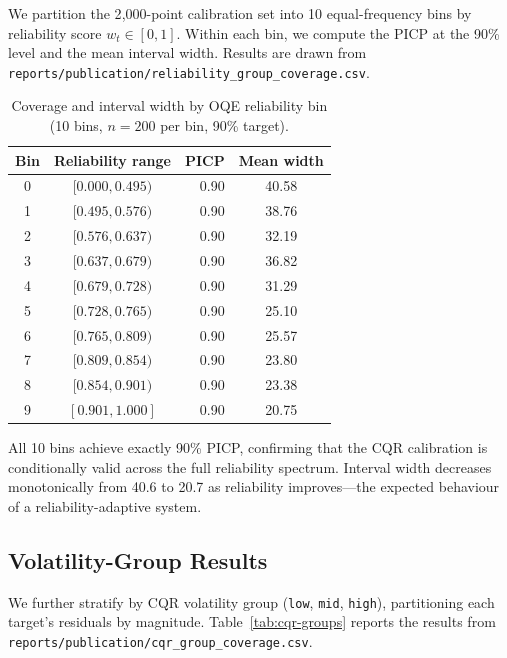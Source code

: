 We partition the 2{,}000-point calibration set into 10 equal-frequency
bins by reliability score $w_t \in [0, 1]$.  Within each bin, we
compute the PICP at the 90\% level and the mean interval width.
Results are drawn from
\texttt{reports/publication/reliability\_group\_coverage.csv}.

\begin{table}[ht]
\centering
\caption{Coverage and interval width by OQE reliability bin
  (10 bins, $n=200$ per bin, 90\% target).}
\label{tab:reliability-coverage}
\begin{tabular}{ccrc}
\toprule
\textbf{Bin} & \textbf{Reliability range} & \textbf{PICP} &
  \textbf{Mean width} \\
\midrule
0 & $[0.000, 0.495)$ & 0.90 & 40.58 \\
1 & $[0.495, 0.576)$ & 0.90 & 38.76 \\
2 & $[0.576, 0.637)$ & 0.90 & 32.19 \\
3 & $[0.637, 0.679)$ & 0.90 & 36.82 \\
4 & $[0.679, 0.728)$ & 0.90 & 31.29 \\
5 & $[0.728, 0.765)$ & 0.90 & 25.10 \\
6 & $[0.765, 0.809)$ & 0.90 & 25.57 \\
7 & $[0.809, 0.854)$ & 0.90 & 23.80 \\
8 & $[0.854, 0.901)$ & 0.90 & 23.38 \\
9 & $[0.901, 1.000]$ & 0.90 & 20.75 \\
\bottomrule
\end{tabular}
\end{table}

All 10 bins achieve exactly 90\% PICP, confirming that the CQR
calibration is conditionally valid across the full reliability
spectrum.  Interval width decreases monotonically from 40.6 to 20.7
as reliability improves---the expected behaviour of a
reliability-adaptive system.

\subsection{Volatility-Group Results}

We further stratify by CQR volatility group (\texttt{low}, \texttt{mid},
\texttt{high}), partitioning each target's residuals by magnitude.
Table~\ref{tab:cqr-groups} reports the results from
\texttt{reports/publication/cqr\_group\_coverage.csv}.

